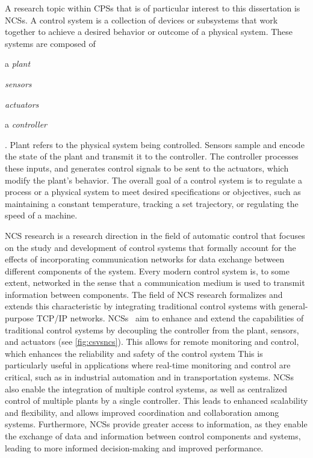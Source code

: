 A research topic within \glspl{CPS} that is of particular interest to this dissertation is \glspl{NCS}. 
A control system is a collection of devices or subsystems that work together to achieve a desired behavior or outcome of a physical system.
These systems are composed of
\begin{inlineenum}
    \item a \emph{plant}
    \item \emph{sensors}
    \item \emph{actuators}
    \item a \emph{controller}
\end{inlineenum}.
Plant refers to the physical system being controlled.
Sensors sample and encode the state of the plant and transmit it to the controller.
The controller processes these inputs, and generates control signals to be sent to the actuators, which modify the plant's behavior.
The overall goal of a control system is to regulate a process or a physical system to meet desired specifications or objectives, such as maintaining a constant temperature, tracking a set trajectory, or regulating the speed of a machine.

\gls{NCS} research is a research direction in the field of automatic control that focuses on the study and development of control systems that formally account for the effects of incorporating communication networks for data exchange between different components of the system.
Every modern control system is, to some extent, networked in the sense that a communication medium is used to transmit information between components.
The field of \gls{NCS} research formalizes and extends this characteristic by integrating traditional control systems with general-purpose \acs{TCP}/\acs{IP} networks.
\glspl{NCS}~\cite{gupta2010networked} aim to enhance and extend the capabilities of traditional control systems by decoupling the controller from the plant, sensors, and actuators (see \cref{fig:csvsncs}).
This allows for remote monitoring and control, which enhances the reliability and safety of the control system
This is particularly useful in applications where real-time monitoring and control are critical, such as in industrial automation and in transportation systems.
\glspl{NCS} also enable the integration of multiple control systems, as well as centralized control of multiple plants by a single controller.
This leads to enhanced scalability and flexibility, and allows improved coordination and collaboration among systems.
Furthermore, \glspl{NCS} provide greater access to information, as they enable the exchange of data and information between control components and systems, leading to more informed decision-making and improved performance.

